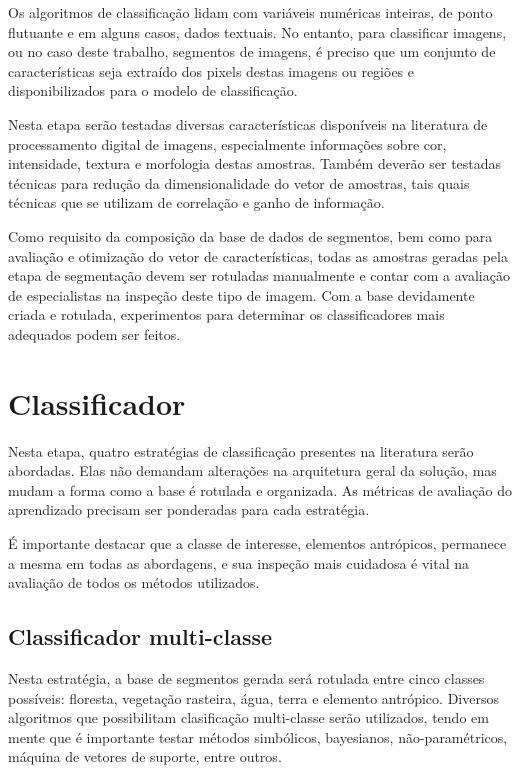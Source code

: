 Os algoritmos de classificação lidam com variáveis numéricas inteiras, de ponto flutuante e em alguns casos, dados textuais. No entanto, para classificar imagens, ou no caso deste trabalho, segmentos de imagens, é preciso que um conjunto de características seja extraído dos pixels destas imagens ou regiões e disponibilizados para o modelo de classificação.

Nesta etapa serão testadas diversas características disponíveis na literatura de processamento digital de imagens, especialmente informações sobre cor, intensidade, textura e morfologia destas amostras. Também deverão ser testadas técnicas para redução da dimensionalidade do vetor de amostras, tais quais técnicas que se utilizam de correlação e ganho de informação.

Como requisito da composição da base de dados de segmentos, bem como para avaliação e otimização do vetor de características, todas as amostras geradas pela etapa de segmentação devem ser rotuladas manualmente e contar com a avaliação de especialistas na inspeção deste tipo de imagem. Com a base devidamente criada e rotulada, experimentos para determinar os classificadores mais adequados podem ser feitos.

\section{Classificador}\label{sec:metClassificador}

Nesta etapa, quatro estratégias de classificação presentes na literatura serão abordadas. Elas não demandam alterações na arquitetura geral da solução, mas mudam a forma como a base é rotulada e organizada. As métricas de avaliação do aprendizado precisam ser ponderadas para cada estratégia.

É importante destacar que a classe de interesse, elementos antrópicos, permanece a mesma em todas as abordagens, e sua inspeção mais cuidadosa é vital na avaliação de todos os métodos utilizados.

\subsection{Classificador multi-classe}

Nesta estratégia, a base de segmentos gerada será rotulada entre cinco classes possíveis: floresta, vegetação rasteira, água, terra e elemento antrópico. Diversos algoritmos que possibilitam clasificação multi-classe serão utilizados, tendo em mente que é importante testar métodos simbólicos, bayesianos, não-paramétricos, máquina de vetores de suporte, entre outros.

